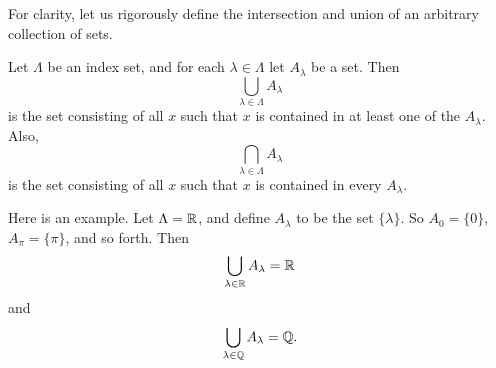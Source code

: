 \documentclass{tufte-book}
\begin{document}
For clarity, let us rigorously define the intersection and union of an arbitrary collection of sets.
\begin{definition}
  Let $\Lambda$ be an index set, and for each $\lambda \in \Lambda$ let $A_\lambda$ be a set. Then
  \[
  \bigcup_{\lambda \in \Lambda} A_\lambda
  \]
  is the set consisting of all $x$ such that $x$ is contained in at least one of the $A_\lambda$. Also,
  \[
  \bigcap_{\lambda \in \Lambda} A_\lambda
  \]
  is the set consisting of all $x$ such that $x$ is contained in every $A_\lambda$.
\end{definition}
Here is an example. Let $\Lambda = \mathbb{R}$, and define $A_\lambda$ to be the set $\{\lambda\}$. So $A_0 = \{0\}$, $A_\pi = \{\pi\}$, and so forth. Then
\[
\bigcup_{\lambda \in \mathbb{R}} A_\lambda = \mathbb{R}
\]
and
\[
\bigcup_{\lambda \in \mathbb{Q}} A_\lambda = \mathbb{Q}.
\]





\end{document}
